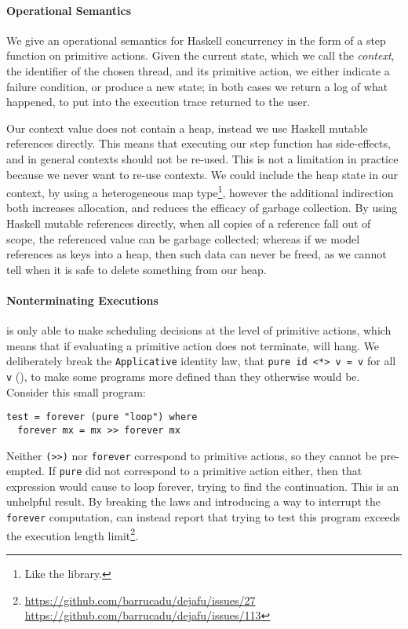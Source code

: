 \paragraph{Operational Semantics}
We give an operational semantics for Haskell concurrency in the form of a step
function on primitive actions.  Given the current state, which we call the
\emph{context}, the identifier of the chosen thread, and its primitive action,
we either indicate a failure condition, or produce a new state; in both cases we
return a log of what happened, to put into the execution trace returned to the
user.

Our context value does not contain a heap, instead we use Haskell mutable
references directly.  This means that executing our step function has
side-effects, and in general contexts should not be re-used.  This is not a
limitation in practice because we never want to re-use contexts.  We could
include the heap state in our context, by using a heterogeneous map
type\footnote{Like the  library.}, however the additional
indirection both increases allocation, and reduces the efficacy of garbage
collection.  By using Haskell mutable references directly, when all copies of a
reference fall out of scope, the referenced value can be garbage collected;
whereas if we model references as keys into a heap, then such data can never be
freed, as we cannot tell when it is safe to delete something from our heap.

\paragraph{Nonterminating Executions}
\dejafu{} is only able to make scheduling decisions at the level of primitive
actions, which means that if evaluating a primitive action does not terminate,
\dejafu{} will hang.  We deliberately break the \verb|Applicative| identity law,
that \verb|pure id <*> v = v| for all \verb|v| (), to make some
programs more defined than they otherwise would be.  Consider this small
program:

\begin{lstlisting}
test = forever (pure "loop") where
  forever mx = mx >> forever mx
\end{lstlisting}

Neither \verb|(>>)| nor \verb|forever| correspond to primitive actions, so they
cannot be pre-empted.  If \verb|pure| did not correspond to a primitive action
either, then that expression would cause \dejafu{} to loop forever, trying to
find the continuation.  This is an unhelpful result.  By breaking the laws and
introducing a way to interrupt the \verb|forever| computation, \dejafu{} can
instead report that trying to test this program exceeds the execution length
limit\footnote{\url{https://github.com/barrucadu/dejafu/issues/27}\\\url{https://github.com/barrucadu/dejafu/issues/113}}.

